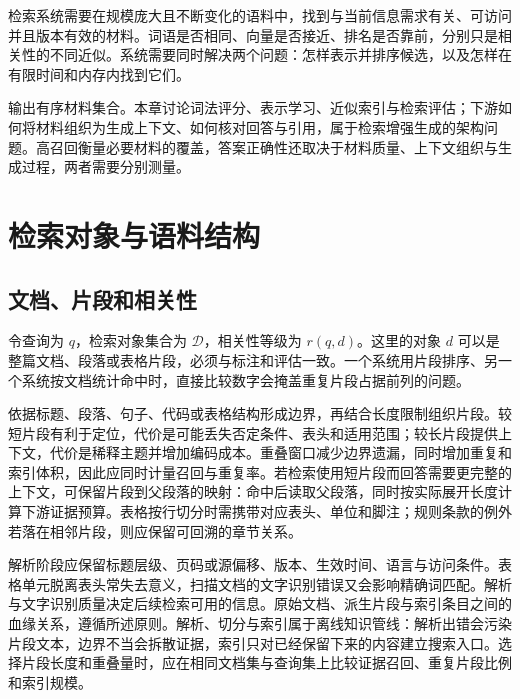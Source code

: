 \documentclass[../textbook.tex]{subfiles}
\begin{document}
\fi
{}

检索系统需要在规模庞大且不断变化的语料中，找到与当前信息需求有关、可访问并且版本有效的材料。词语是否相同、向量是否接近、排名是否靠前，分别只是相关性的不同近似。系统需要同时解决两个问题：怎样表示并排序候选，以及怎样在有限时间和内存内找到它们。

输出有序材料集合。本章讨论词法评分、表示学习、近似索引与检索评估；下游如何将材料组织为生成上下文、如何核对回答与引用，属于检索增强生成的架构问题。高召回衡量必要材料的覆盖，答案正确性还取决于材料质量、上下文组织与生成过程，两者需要分别测量。

\section{检索对象与语料结构}

\subsection{文档、片段和相关性}
令查询为 $q$，检索对象集合为 $\mathcal D$，相关性等级为 $r(q,d)$。这里的对象 $d$ 可以是整篇文档、段落或表格片段，必须与标注和评估一致。一个系统用片段排序、另一个系统按文档统计命中时，直接比较数字会掩盖重复片段占据前列的问题。

依据标题、段落、句子、代码或表格结构形成边界，再结合长度限制组织片段。较短片段有利于定位，代价是可能丢失否定条件、表头和适用范围；较长片段提供上下文，代价是稀释主题并增加编码成本。重叠窗口减少边界遗漏，同时增加重复和索引体积，因此应同时计量召回与重复率。若检索使用短片段而回答需要更完整的上下文，可保留片段到父段落的映射：命中后读取父段落，同时按实际展开长度计算下游证据预算。表格按行切分时需携带对应表头、单位和脚注；规则条款的例外若落在相邻片段，则应保留可回溯的章节关系。

解析阶段应保留标题层级、页码或源偏移、版本、生效时间、语言与访问条件。表格单元脱离表头常失去意义，扫描文档的文字识别错误又会影响精确词匹配。解析与文字识别质量决定后续检索可用的信息。原始文档、派生片段与索引条目之间的血缘关系，遵循所述原则。解析、切分与索引属于离线知识管线：解析出错会污染片段文本，边界不当会拆散证据，索引只对已经保留下来的内容建立搜索入口。选择片段长度和重叠量时，应在相同文档集与查询集上比较证据召回、重复片段比例和索引规模。
\end{document}
